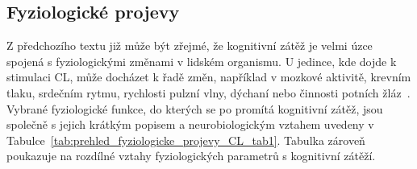 \subsection{Fyziologické projevy}
\label{subsec:fyziologicke_projevy_CL}
Z předchozího textu již může být zřejmé, že kognitivní zátěž je velmi úzce
spojená s fyziologickými změnami v lidském organismu. U jedince, kde dojde k
stimulaci CL, může docházet k řadě změn, například v mozkové aktivitě, krevním
tlaku, srdečním rytmu, rychlosti pulzní vlny, dýchaní nebo činnosti potních
žláz~\cite{Vanneste2021,Haapalainen2010,Thayer2009,Gjoreski2017,Cruz2019,Brouwer2015}.
Vybrané fyziologické funkce, do kterých se po promítá kognitivní zátěž, jsou
společně s jejich krátkým popisem a neurobiologickým vztahem uvedeny v
Tabulce~\ref{tab:prehled_fyziologicke_projevy_CL_tab1}. Tabulka zároveň
poukazuje na rozdílné vztahy fyziologických parametrů s kognitivní zátěží.

